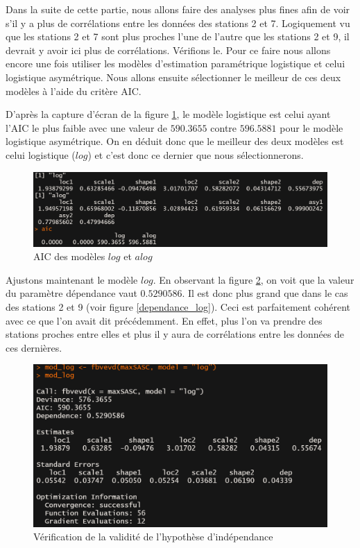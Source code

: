 \documentclass[a4paper,french,10pt]{article}
\begin{document}
Dans la suite de cette partie, nous allons faire des analyses plus fines afin de voir s'il y a plus de corrélations entre les données des stations 2 et 7. Logiquement vu que les stations 2 et 7 sont plus proches l'une de l'autre que les stations 2 et 9, il devrait y avoir ici plus de corrélations. Vérifions le. Pour ce faire nous allons encore une fois utiliser les modèles d'estimation paramétrique logistique et celui logistique asymétrique. Nous allons ensuite sélectionner le meilleur de ces deux modèles à l'aide du critère AIC.

D'après la capture d'écran de la figure \ref{AIC_2_7}, le modèle logistique est celui ayant l'AIC le plus faible avec une valeur de $590.3655$ contre $596.5881$ pour le modèle logistique asymétrique. On en déduit donc que le meilleur des deux modèles est celui logistique ($log$) et c'est donc ce dernier que nous sélectionnerons.

\begin{figure}[htp] 
	\centering
	\includegraphics[scale=0.45]{images/AIC_stations2_7.png}
	\caption{AIC des modèles $log$ et $alog$}
	\label{AIC_2_7}
\end{figure}

Ajustons maintenant le modèle $log$. En observant la figure \ref{dependance_log2}, on voit que la valeur du paramètre dépendance vaut $0.5290586$. Il est donc plus grand que dans le cas des stations 2 et 9 (voir figure \ref{dependance_log}). Ceci est parfaitement cohérent avec ce que l'on avait dit précédemment. En effet, plus l'on va prendre des stations proches entre elles et plus il y aura de corrélations entre les données de ces dernières.

\begin{figure}[htp] 
	\centering
	\includegraphics[scale=0.45]{images/dependance_log2.png}
	\caption{Vérification de la validité de l'hypothèse d'indépendance}
	\label{dependance_log2}
\end{figure}
\end{document}
